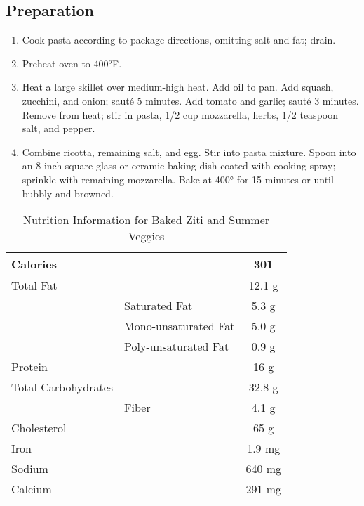 \subsection{Preparation}
\begin{enumerate}
    \item Cook pasta according to package directions, omitting salt and fat; drain.
    \item Preheat oven to 400$^o$F.
    \item Heat a large skillet over medium-high heat. Add oil to pan. Add squash, zucchini, and onion; saut\'{e} 5 minutes. Add tomato and garlic; saut\'{e} 3 minutes. Remove from heat; stir in pasta, 1/2 cup mozzarella, herbs, 1/2 teaspoon salt, and pepper.
    \item Combine ricotta, remaining salt, and egg. Stir into pasta mixture. Spoon into an 8-inch square glass or ceramic baking dish coated with cooking spray; sprinkle with remaining mozzarella. Bake at 400° for 15 minutes or until bubbly and browned.
\end{enumerate}

\begin{table}%
    \centering
    \begin{tabular}{|ll|c|}
        \hline
        Calories & & 301\\
        \hline
        Total Fat & & 12.1 g \\
        & Saturated Fat & 5.3 g\\
        & Mono-unsaturated Fat & 5.0 g\\
        & Poly-unsaturated Fat & 0.9 g\\
        \hline
        Protein & & 16 g\\
        \hline
        Total Carbohydrates & & 32.8 g\\
        & Fiber & 4.1 g\\
        \hline
        Cholesterol & & 65 g\\
        \hline
        Iron & & 1.9 mg\\
        \hline
        Sodium & & 640 mg\\
        \hline
        Calcium & & 291 mg\\
        \hline
    \end{tabular}
    \caption{Nutrition Information for Baked Ziti and Summer Veggies}
\end{table}

